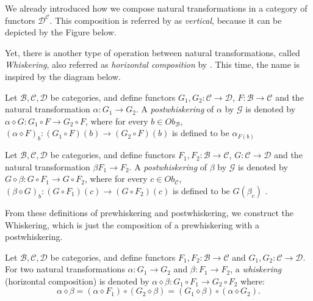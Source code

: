 We already introduced how we compose natural transformations in
a category of functors $\mathcal D^{\mathcal C}$. This composition
is referred by \citet{spivak2014category} as \textit{vertical}, because
it can be depicted by the Figure below.

Yet, there is another type of operation between natural transformations,
called \textit{Whiskering}, also referred as \textit{horizontal composition}
by \citet{spivak2014category}. This time, the name is inspired by
the diagram below.

\begin{definition}[Prewhiskering]
	Let $\mathcal B, \mathcal C, \mathcal D$ be categories, and define
	functors $G_1,G_2:\mathcal C \to \mathcal D$,
	$F:\mathcal B \to \mathcal C$ and the natural transformation
	$\alpha: G_1 \to G_2$.
	A \textit{postwhiskering}
	of $\alpha$ by $\mathcal G$ is denoted by $\alpha \diamond G:G_1 \circ F \to G_2 \circ F$,
	where for every $b \in Ob_\mathcal B$, $(\alpha \diamond F)_b:(G_1 \circ F)(b) \to (G_2 \circ F)(b)$
	is defined to be $\alpha_{F(b)}$
	\label{def:prewhiskering}
\end{definition}

\begin{definition}[Postwhiskering]
	Let $\mathcal B, \mathcal C, \mathcal D$ be categories, and define
	functors $F_1,F_2:\mathcal B \to \mathcal C$,
	$G:\mathcal C \to \mathcal D$ and the natural transformation
	$\beta F_1 \to F_2$.
	A \textit{postwhiskering}
	of $\beta$ by $\mathcal G$ is denoted by $G \diamond \beta:G \circ F_1 \to G \circ F_2$,
	where for every $c \in Ob_\mathcal C$, $(\beta \diamond G)_b:(G \circ F_1)(c) \to (G \circ F_2)(c)$
	is defined to be $G(\beta_c)$ .
	\label{def:postwhiskering}
\end{definition}

From these definitions of prewhiskering and postwhiskering, we construct the Whiskering,
which is just the composition of a prewhiskering with a postwhiskering.

\begin{definition}
	Let $\mathcal B, \mathcal C, \mathcal D$ be categories, and define
	functors $F_1,F_2:\mathcal B \to \mathcal C$ and
	$G_1, G_2 :\mathcal C \to \mathcal D$. For two natural transformations
	$\alpha: G_1 \to G_2$ and $\beta: F_1 \to F_2$,
	a \textit{whiskering} (horizontal composition)
	is denoted by
	$\alpha \diamond \beta: G_1\circ F_1 \rightarrow G_2 \circ F_2$
	where:
	\begin{displaymath}
		\alpha \diamond \beta
		= (\alpha \diamond F_1) \circ (G_2 \diamond \beta)
		= (G_1 \diamond \beta) \circ (\alpha \diamond G_2).
	\end{displaymath}
	\label{def:Whiskering}
\end{definition}


